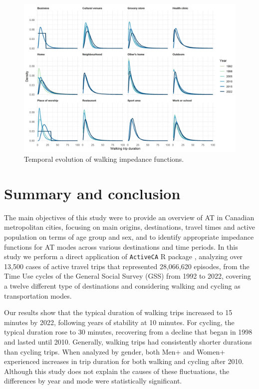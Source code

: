 \documentclass[preprint, 3p,
authoryear]{elsarticle} %
\begin{document}
\begin{figure}

{\centering \includegraphics[width=1\linewidth]{figures/walking_temporal_evolution} 

}

\caption{Temporal evolution of walking impedance functions.}\label{fig:walking-evolution-fig}
\end{figure}

\section{Summary and conclusion}\label{summary-and-conclusion}

The main objectives of this study were to provide an overview of AT in
Canadian metropolitan cities, focusing on main origins, destinations,
travel times and active population on terms of age group and sex, and to
identify appropriate impedance functions for AT modes across various
destinations and time periods. In this study we perform a direct
application of \texttt{ActiveCA} R package
\citep{dossantos2024ActiveCA}, analyzing over 13,500 cases of active
travel trips that represented 28,066,620 episodes, from the Time Use
cycles of the General Social Survey (GSS) from 1992 to 2022, covering a
twelve different type of destinations and considering walking and
cycling as transportation modes.

Our results show that the typical duration of walking trips increased to
15 minutes by 2022, following years of stability at 10 minutes. For
cycling, the typical duration rose to 30 minutes, recovering from a
decline that began in 1998 and lasted until 2010. Generally, walking
trips had consistently shorter durations than cycling trips. When
analyzed by gender, both Men+ and Women+ experienced increases in trip
duration for both walking and cycling after 2010. Although this study
does not explain the causes of these fluctuations, the differences by
year and mode were statistically significant.
\end{document}
